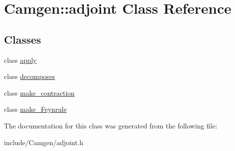 \hypertarget{a00002}{\section{Camgen\-:\-:adjoint Class Reference}
\label{a00002}
}
\subsection*{Classes}
\begin{DoxyCompactItemize}
\item 
class \hyperlink{a00011}{apply}
\item 
class \hyperlink{a00126}{decomposes}
\item 
class \hyperlink{a00337}{make\-\_\-contraction}
\item 
class \hyperlink{a00340}{make\-\_\-\-Feynrule}
\end{DoxyCompactItemize}


The documentation for this class was generated from the following file\-:\begin{DoxyCompactItemize}
\item 
include/\-Camgen/adjoint.\-h\end{DoxyCompactItemize}
